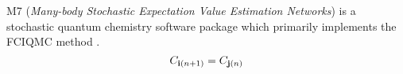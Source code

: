 M7 ({\itshape Many-\/body Stochastic Expectation Value Estimation Networks}) is a stochastic quantum chemistry software package which primarily implements the F\+C\+I\+Q\+MC method \cite{doi:10.1063/1.3193710}. \[ C_{\mathbf{i}(n+1)} = C_{\mathbf{j}(n)} \] 